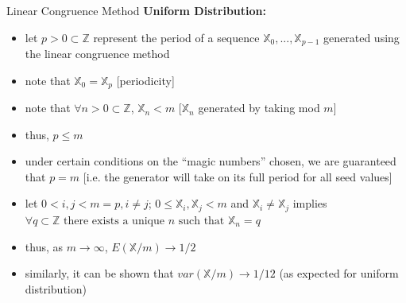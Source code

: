\documentclass{beamer}
\begin{document}
\begin{frame}{Linear Congruence Method}
\textbf{Uniform Distribution:} 
\begin{itemize}
    \item let $p > 0 \subset \mathbb{Z}$ represent the period of a sequence $\mathbb{X}_0, ..., \mathbb{X}_{p - 1}$ generated using the linear congruence method
    \pause \item note that $\mathbb{X}_0 = \mathbb{X}_{p}$ [periodicity]
    \item note that $\forall n > 0 \subset \mathbb{Z}$, $\mathbb{X}_{n} < m$ [$\mathbb{X}_{n}$ generated by taking mod $m$]
    \item thus, $p \leq m$
   \pause \item under certain conditions on the ``magic numbers'' chosen, we are guaranteed that $p = m$ [i.e. the generator will take on its full period for all seed values]
    \pause \item let $0 < i, j < m = p, i \neq j$; $0 \leq \mathbb{X}_{i}, \mathbb{X}_{j} < m$ and $\mathbb{X}_{i} \neq \mathbb{X}_{j}$ implies $\forall q \subset \mathbb{Z} \text{ there exists a unique } n \text{ such that } \mathbb{X}_n = q$
\pause \item thus, as $m \rightarrow \infty$,  $E(\mathbb{X}/m) \rightarrow 1/2$
\pause \item similarly, it can be shown that $var(\mathbb{X}/m) \rightarrow 1/12$ (as expected for uniform distribution)

\end{itemize} 

\end{frame}
\end{document}
